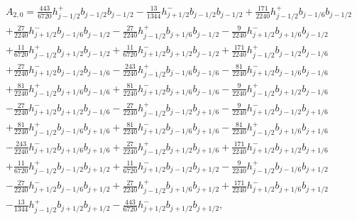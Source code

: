 \documentclass[12pt]{article}
\begin{document}
\begin{multline*} A_{2,0} = \frac{443}{6720} h_{j-1/2}^+ b_{j-1/2} b_{j-1/2}-\frac{13}{1344} h_{j+1/2}^- b_{j-1/2} b_{j-1/2}+\frac{171}{2240} h_{j-1/2}^+ b_{j-1/6} b_{j-1/2}\\+\frac{27}{2240} h_{j+1/2}^- b_{j-1/6} b_{j-1/2}-\frac{27}{2240} h_{j-1/2}^+ b_{j+1/6} b_{j-1/2}-\frac{9}{2240} h_{j+1/2}^- b_{j+1/6} b_{j-1/2}\\+\frac{11}{6720} h_{j-1/2}^+ b_{j+1/2} b_{j-1/2}+\frac{11}{6720} h_{j+1/2}^- b_{j+1/2} b_{j-1/2}+\frac{171}{2240} h_{j-1/2}^+ b_{j-1/2} b_{j-1/6}\\+\frac{27}{2240} h_{j+1/2}^- b_{j-1/2} b_{j-1/6}-\frac{243}{2240} h_{j-1/2}^+ b_{j-1/6} b_{j-1/6}-\frac{81}{2240} h_{j+1/2}^- b_{j-1/6} b_{j-1/6}\\+\frac{81}{2240} h_{j-1/2}^+ b_{j+1/6} b_{j-1/6}+\frac{81}{2240} h_{j+1/2}^- b_{j+1/6} b_{j-1/6}-\frac{9}{2240} h_{j-1/2}^+ b_{j+1/2} b_{j-1/6}\\-\frac{27}{2240} h_{j+1/2}^- b_{j+1/2} b_{j-1/6}-\frac{27}{2240} h_{j-1/2}^+ b_{j-1/2} b_{j+1/6}-\frac{9}{2240} h_{j+1/2}^- b_{j-1/2} b_{j+1/6}\\+\frac{81}{2240} h_{j-1/2}^+ b_{j-1/6} b_{j+1/6}+\frac{81}{2240} h_{j+1/2}^- b_{j-1/6} b_{j+1/6}-\frac{81}{2240} h_{j-1/2}^+ b_{j+1/6} b_{j+1/6}\\-\frac{243}{2240} h_{j+1/2}^- b_{j+1/6} b_{j+1/6}+\frac{27}{2240} h_{j-1/2}^+ b_{j+1/2} b_{j+1/6}+\frac{171}{2240} h_{j+1/2}^- b_{j+1/2} b_{j+1/6}\\+\frac{11}{6720} h_{j-1/2}^+ b_{j-1/2} b_{j+1/2}+\frac{11}{6720} h_{j+1/2}^- b_{j-1/2} b_{j+1/2}-\frac{9}{2240} h_{j-1/2}^+ b_{j-1/6} b_{j+1/2}\\-\frac{27}{2240} h_{j+1/2}^- b_{j-1/6} b_{j+1/2}+\frac{27}{2240} h_{j-1/2}^+ b_{j+1/6} b_{j+1/2}+\frac{171}{2240} h_{j+1/2}^- b_{j+1/6} b_{j+1/2}\\-\frac{13}{1344} h_{j-1/2}^+ b_{j+1/2} b_{j+1/2}-\frac{443}{6720} h_{j+1/2}^- b_{j+1/2} b_{j+1/2}, \end{multline*}
\end{document}
